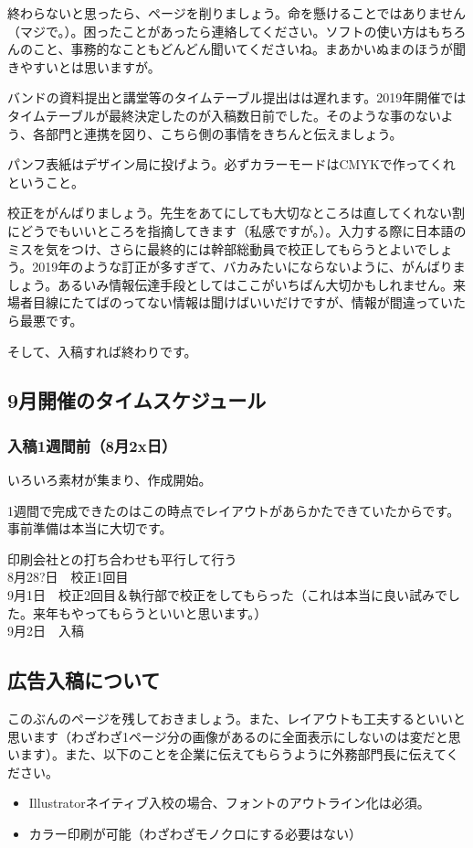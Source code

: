 \documentclass[dvipdfmx,jb5]{jarticle}
\begin{document}
終わらないと思ったら、ページを削りましょう。命を懸けることではありません（マジで。）。困ったことがあったら連絡してください。ソフトの使い方はもちろんのこと、事務的なこともどんどん聞いてくださいね。まあかいぬまのほうが聞きやすいとは思いますが。

バンドの資料提出と講堂等のタイムテーブル提出はは遅れます。2019年開催ではタイムテーブルが最終決定したのが入稿数日前でした。そのような事のないよう、各部門と連携を図り、こちら側の事情をきちんと伝えましょう。

パンフ表紙はデザイン局に投げよう。必ずカラーモードはCMYKで作ってくれということ。

校正をがんばりましょう。先生をあてにしても大切なところは直してくれない割にどうでもいいところを指摘してきます（私感ですが。）。入力する際に日本語のミスを気をつけ、さらに最終的には幹部総動員で校正してもらうとよいでしょう。2019年のような訂正が多すぎて、バカみたいにならないように、がんばりましょう。あるいみ情報伝達手段としてはここがいちばん大切かもしれません。来場者目線にたてばのってない情報は聞けばいいだけですが、情報が間違っていたら最悪です。

そして、入稿すれば終わりです。

\subsection{9月開催のタイムスケジュール}
\subsubsection{入稿1週間前（8月2x日）}
いろいろ素材が集まり、作成開始。

1週間で完成できたのはこの時点でレイアウトがあらかたできていたからです。事前準備は本当に大切です。

印刷会社との打ち合わせも平行して行う\\
8月28?日　校正1回目\\
9月1日　校正2回目＆執行部で校正をしてもらった（これは本当に良い試みでした。来年もやってもらうといいと思います。）\\
9月2日　入稿\\

\subsection{広告入稿について}
このぶんのページを残しておきましょう。また、レイアウトも工夫するといいと思います（わざわざ1ページ分の画像があるのに全面表示にしないのは変だと思います）。また、以下のことを企業に伝えてもらうように外務部門長に伝えてください。
\begin{itemize}
  \item Illustratorネイティブ入校の場合、フォントのアウトライン化は必須。
  \item カラー印刷が可能（わざわざモノクロにする必要はない）
\end{itemize}
\end{document}
